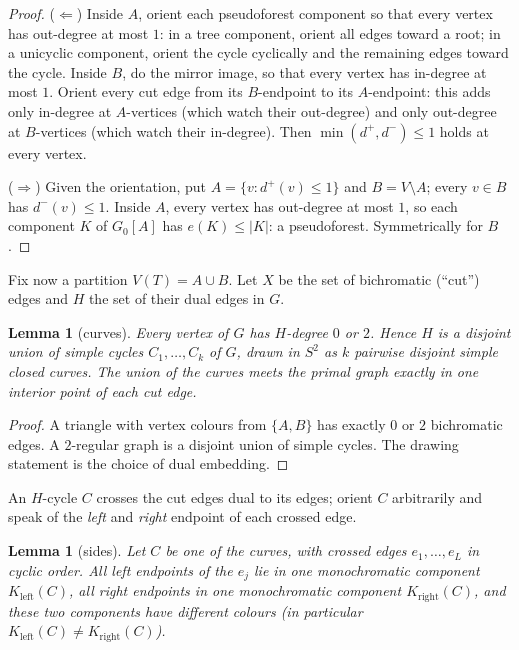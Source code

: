 \documentclass[11pt]{article}
\newtheorem{lemma}[theorem]{Lemma}
\theoremstyle{remark}
\newcommand{\dout}{d^{+}}
\newcommand{\din}{d^{-}}
\begin{document}
\begin{proof}
($\Leftarrow$) Inside $A$, orient each pseudoforest component so that
every vertex has out-degree at most $1$: in a tree component, orient all
edges toward a root; in a unicyclic component, orient the cycle
cyclically and the remaining edges toward the cycle. Inside $B$, do the
mirror image, so that every vertex has in-degree at most $1$. Orient
every cut edge from its $B$-endpoint to its $A$-endpoint: this adds only
in-degree at $A$-vertices (which watch their out-degree) and only
out-degree at $B$-vertices (which watch their in-degree). Then
$\min(\dout,\din)\le 1$ holds at every vertex.

($\Rightarrow$) Given the orientation, put $A=\{v:\dout(v)\le 1\}$ and
$B=V\setminus A$; every $v\in B$ has $\din(v)\le 1$. Inside $A$, every
vertex has out-degree at most $1$, so each component $K$ of $G_0[A]$ has
$e(K)\le|K|$: a pseudoforest. Symmetrically for $B$.
\end{proof}

Fix now a partition $V(T)=A\cup B$. Let $X$ be the set of bichromatic
(``cut'') edges and $H$ the set of their dual edges in $G$.

\begin{lemma}[curves]\label{lem:curves}
Every vertex of $G$ has $H$-degree $0$ or $2$. Hence $H$ is a disjoint
union of simple cycles $C_1,\dots,C_k$ of $G$, drawn in $S^2$ as $k$
pairwise disjoint simple closed curves. The union of the curves meets the
primal graph exactly in one interior point of each cut edge.
\end{lemma}

\begin{proof}
A triangle with vertex colours from $\{A,B\}$ has exactly $0$ or $2$
bichromatic edges. A $2$-regular graph is a disjoint union of simple
cycles. The drawing statement is the choice of dual embedding.
\end{proof}

An $H$-cycle $C$ crosses the cut edges dual to its edges; orient $C$
arbitrarily and speak of the \emph{left} and \emph{right} endpoint of
each crossed edge.

\begin{lemma}[sides]\label{lem:sides}
Let $C$ be one of the curves, with crossed edges $e_1,\dots,e_L$ in
cyclic order. All left endpoints of the $e_j$ lie in one monochromatic
component $K_{\mathrm{left}}(C)$, all right endpoints in one
monochromatic component $K_{\mathrm{right}}(C)$, and these two components
have different colours (in particular
$K_{\mathrm{left}}(C)\ne K_{\mathrm{right}}(C)$).
\end{lemma}
\end{document}
